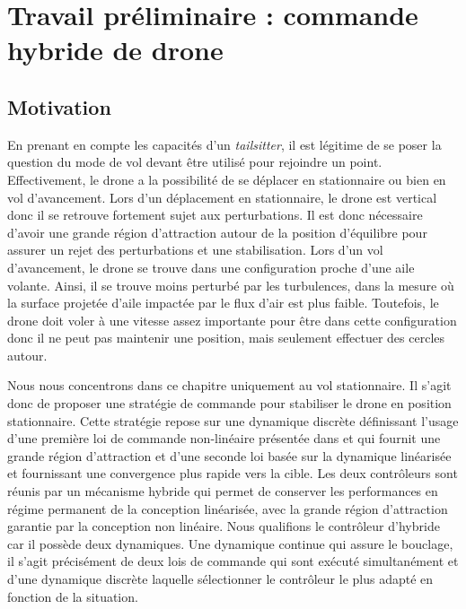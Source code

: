 \chapter{Travail préliminaire : commande hybride de drone}
\label{chap:hybrid}
\minitoc




\section{Motivation}
En prenant en compte les capacités d'un \textit{tailsitter}, il est légitime de se poser la question du mode de vol devant être utilisé pour rejoindre un point. Effectivement, le drone a la possibilité de se déplacer en stationnaire ou bien en vol d'avancement. Lors d'un déplacement en stationnaire, le drone est vertical donc il se retrouve fortement sujet aux perturbations. Il est donc nécessaire d'avoir une grande région d'attraction autour de la position d'équilibre pour assurer un rejet des perturbations et une stabilisation. Lors d'un vol d'avancement, le drone se trouve dans une configuration proche d'une aile volante. Ainsi, il se trouve moins perturbé par les turbulences, dans la mesure où la surface projetée d'aile impactée par le flux d'air est plus faible. Toutefois, le drone doit voler à une vitesse assez importante pour être dans cette configuration donc il ne peut pas maintenir une position, mais seulement effectuer des cercles autour. 

Nous nous concentrons dans ce chapitre uniquement au vol stationnaire. Il s'agit donc de proposer une stratégie de commande pour stabiliser le drone en position stationnaire. Cette stratégie repose sur une dynamique discrète définissant l'usage d'une première loi de commande non-linéaire présentée dans \cite{2020e-MicCenZacFra} et qui fournit une grande région d'attraction et d'une seconde loi basée sur la dynamique linéarisée et fournissant une convergence plus rapide vers la cible. Les deux contrôleurs sont réunis par un mécanisme hybride qui permet de conserver les performances en régime permanent de la conception linéarisée, avec la grande région d'attraction garantie par la conception non linéaire.
{ \color{blue}
  Nous qualifions le contrôleur d'hybride car il possède deux dynamiques. Une dynamique continue qui assure le bouclage, il s'agit précisément de deux lois de commande qui sont exécuté simultanément et d'une dynamique discrète laquelle sélectionner le contrôleur le plus adapté en fonction de la situation.
}

